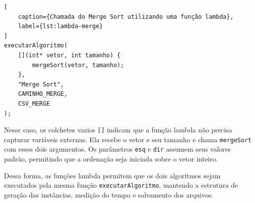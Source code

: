 \begin{lstlisting}[
    caption={Chamada do Merge Sort utilizando uma função lambda},
    label={lst:lambda-merge}
]
executarAlgoritmo(
    [](int* vetor, int tamanho) {
        mergeSort(vetor, tamanho);
    },
    "Merge Sort",
    CAMINHO_MERGE,
    CSV_MERGE
);
\end{lstlisting}

Nesse caso, os colchetes vazios \texttt{[]} indicam que a função lambda não precisa capturar variáveis externas. Ela recebe o vetor e seu tamanho e chama \texttt{mergeSort} com esses dois argumentos. Os parâmetros \texttt{esq} e \texttt{dir} assumem seus valores padrão, permitindo que a ordenação seja iniciada sobre o vetor inteiro.

Dessa forma, as funções lambda permitem que os dois algoritmos sejam executados pela mesma função \texttt{executarAlgoritmo}, mantendo a estrutura de geração das instâncias, medição do tempo e salvamento dos arquivos.